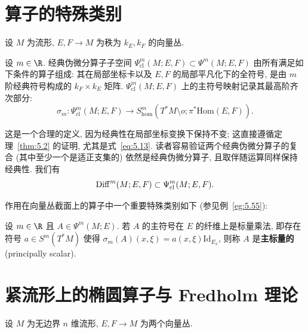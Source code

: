 \section{算子的特殊类别}\label{sec:5.8}
%

设 $M$ 为流形, $E, F \to M$ 为秩为 $k_E, k_F$ 的向量丛.

\begin{definition}[流形上的经典伪微分算子]\label{def:5.46}
设 $m \in \R$. 经典伪微分算子子空间 $\Psi_{\mathrm{cl}}^m(M; E, F) \subset \Psi^m(M; E, F)$ 由所有满足如下条件的算子组成: 其在局部坐标卡以及 $E, F$ 的局部平凡化下的全符号, 是由 $m$ 阶经典符号构成的 $k_F \times k_E$ 矩阵. $\Psi_{\mathrm{cl}}^m(M; E, F)$ 上的主符号映射记录其最高阶齐次部分:
\begin{equation}\label{eq:5.107}
    \sigma_m \colon \Psi_{\mathrm{cl}}^m(M; E, F) \to S_{\mathrm{hom}}^m(T^* M \setminus o; \pi^* \mathrm{Hom}(E, F)).
\end{equation}
\end{definition}

这是一个合理的定义, 因为经典性在局部坐标变换下保持不变; 这直接遵循定理~\ref{thm:5.2} 的证明, 尤其是式~\eqref{eq:5.13}. 读者容易验证两个经典伪微分算子的复合 (其中至少一个是适正支集的) 依然是经典伪微分算子, 且取伴随运算同样保持经典性. 我们有
\begin{equation}\label{eq:5.108}
    \operatorname{Diff}^m(M; E, F) \subset \Psi_{\mathrm{cl}}^m(M; E, F).
\end{equation}

作用在向量丛截面上的算子中一个重要特殊类别如下 (参见例~\ref{eg:5.55}):

\begin{definition}[主标量算子]\label{def:5.47}
设 $m \in \R$ 且 $A \in \Psi^m(M; E)$. 若 $A$ 的主符号在 $E$ 的纤维上是标量乘法, 即存在符号 $a \in S^m(T^* M)$ 使得 $\sigma_m(A)(x, \xi) = a(x, \xi) \mathrm{Id}_{E_x}$, 则称 $A$ 是\textbf{主标量的} (principally scalar).
\end{definition}

\section{紧流形上的椭圆算子与 Fredholm 理论}\label{sec:5.9}
%
%
%

设 $M$ 为无边界 $n$ 维流形, $E, F \to M$ 为两个向量丛.

